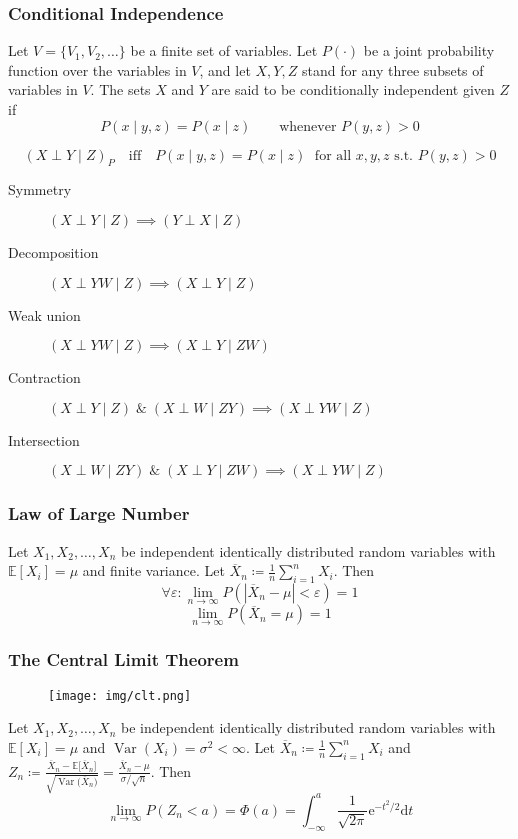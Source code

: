 \documentclass[UTF8,11pt,colorlinks,compress,openany]{beamer}%
\begin{document}
\begin{frame}\frametitle{Conditional Independence}
\begin{definition}
Let $V=\{V_1,V_2,\dots\}$ be a finite set of variables. Let $P(\cdot)$ be a joint probability function over the variables in $V$, and let $X,Y,Z$ stand for any three subsets of variables in $V$. The sets $X$ and $Y$ are said to be conditionally independent given $Z$ if
\[P(x\mid y,z)=P(x\mid z)\qquad \mbox{whenever } P(y,z)>0\]	
\end{definition}
\[(X\perp Y\mid Z)_P\quad\mbox{iff}\quad P(x\mid y,z)=P(x\mid z)\;\mbox{ for all } x,y,z \mbox{ s.t. } P(y,z)>0\]
\begin{description}
	\item[Symmetry] $(X\perp Y\mid Z)\implies (Y\perp X\mid Z)$
	\item[Decomposition] $(X\perp YW\mid Z)\implies (X\perp Y\mid Z)$
	\item[Weak union] $(X\perp YW\mid Z)\implies (X\perp Y\mid ZW)$
	\item[Contraction] $(X\perp Y\mid Z)\;\&\;(X\perp W\mid ZY)\implies (X\perp YW\mid Z)$
	\item[Intersection] $(X\perp W\mid ZY)\;\&\;(X\perp Y\mid ZW)\implies (X\perp YW\mid Z)$
\end{description}
\end{frame}

\begin{frame}\frametitle{Law of Large Number}
\begin{theorem}
Let $X_1,X_2,\dots,X_n$ be independent identically distributed random variables with $\mathbb{E}[X_i]=\mu$ and finite variance. Let $\overline{X}_n\coloneqq \frac{1}{n}\sum\limits_{i=1}^n X_i$. Then
\[\forall\varepsilon: \lim\limits_{n\to\infty}P\left(\left|\overline{X}_n-\mu\right|<\varepsilon\right)=1\tag{weak}\]
\[\lim\limits_{n\to\infty}P\left(\overline{X}_n=\mu\right)=1\tag{strong}\]
\end{theorem}
\end{frame}

\begin{frame}\frametitle{The Central Limit Theorem}
\begin{figure}[H]
\texttt{[image: img/clt.png]}
\end{figure}
\begin{theorem}
Let $X_1,X_2,\dots,X_n$ be independent identically distributed random variables with $\mathbb{E}[X_i]=\mu$ and $\operatorname{Var}(X_i)=\sigma^2<\infty$. Let $\overline{X}_n\coloneqq \frac{1}{n}\sum\limits_{i=1}^n X_i$ and $Z_n\coloneqq \frac{\overline{X}_n-\mathbb{E}\big[\overline{X}_n\big]}{\sqrt{\operatorname{Var}\big(\overline{X}_n\big)}}=\frac{\overline{X}_n-\mu}{\sigma/\sqrt{n}}$. Then
\[\lim\limits_{n\to\infty}P\left(Z_n<a\right)=\Phi(a)=\int_{-\infty}^a \frac{1}{\sqrt{2\pi}}\mathrm{e}^{-t^2/2}\mathrm{d}t\]
\end{theorem}
\end{frame}
\end{document}
